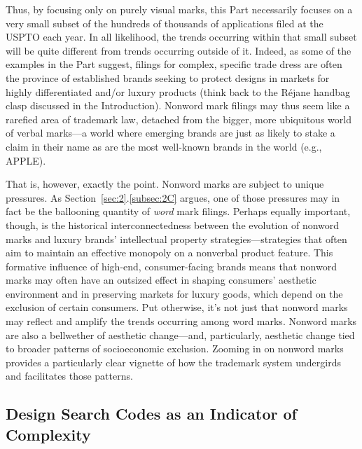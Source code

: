 \documentclass[letterpaper, 11pt, oneside]{article}
\begin{document}
Thus, by focusing only on purely visual marks, this Part necessarily focuses on a very small subset of the hundreds of thousands of applications filed at the USPTO each year. In all likelihood, the trends occurring within that small subset will be quite different from trends occurring outside of it. Indeed, as some of the examples in the Part suggest, filings for complex, specific trade dress are often the province of established brands seeking to protect designs in markets for highly differentiated and/or luxury products (think back to the Réjane handbag clasp discussed in the Introduction). Nonword mark filings may thus seem like a rarefied area of trademark law, detached from the bigger, more ubiquitous world of verbal marks—a world where emerging brands are just as likely to stake a claim in their name as are the most well-known brands in the world (e.g., APPLE).

That is, however, exactly the point. Nonword marks are subject to unique pressures. As Section~\ref{sec:2}.\ref{subsec:2C} argues, one of those pressures may in fact be the ballooning quantity of \textit{word} mark filings. Perhaps equally important, though, is the historical interconnectedness between the evolution of nonword marks and luxury brands' intellectual property strategies—strategies that often aim to maintain an effective monopoly on a nonverbal product feature. This formative influence of high-end, consumer-facing brands means that nonword marks may often have an outsized effect in shaping consumers' aesthetic environment and in preserving markets for luxury goods, which depend on the exclusion of certain consumers. Put otherwise, it's not just that nonword marks may reflect and amplify the trends occurring among word marks. Nonword marks are also a bellwether of aesthetic change—and, particularly, aesthetic change tied to broader patterns of socioeconomic exclusion. Zooming in on nonword marks provides a particularly clear vignette of how the trademark system undergirds and facilitates those patterns.

\subsection{Design Search Codes as an Indicator of Complexity}\label{subsec:2A}
\end{document}
